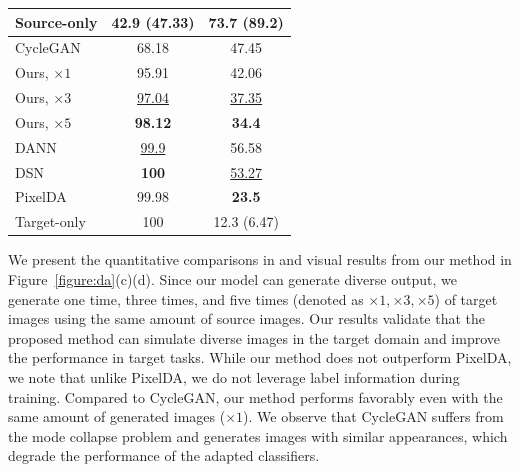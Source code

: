 \documentclass[runningheads]{llncs}
\begin{document}
\begin{table}[t]
{\begin{tabular}{l cc}
        Source-only & 42.9 (47.33) & 73.7 (89.2) \\
        \midrule
        CycleGAN~\cite{zhu2017cyclegan} & 68.18 & 47.45 \\
        Ours, $\times 1$ & 95.91 & 42.06\\
        Ours, $\times 3$ & \underline{97.04} & \underline{37.35}\\
        Ours, $\times 5$ & \textbf{98.12} & \textbf{34.4}\\
        \midrule
        DANN~\cite{ganin2016domain} & \underline{99.9} & 56.58 \\
        DSN~\cite{bousmalis2016domain} & \textbf{100} & \underline{53.27} \\
        PixelDA~\cite{bousmalis2017unsupervisedda} & 99.98 &\textbf{23.5} \\ 
        \midrule
        Target-only & 100 &12.3 (6.47) \\
        \bottomrule
	\end{tabular}}
    \vspace{-4mm}
\end{table}


We present the quantitative comparisons in  and visual results from our method in Figure~\ref{figure:da}(c)(d).
%
Since our model can generate diverse output, we generate one time, three times, and five times (denoted as $\times 1, \times3, \times 5$) of target images using the same amount of source images.
%
Our results validate that the proposed method can simulate diverse images in the target domain and improve the performance in target tasks.
%
While our method does not outperform PixelDA, we note that unlike PixelDA, we do not leverage label information during training.
%
Compared to CycleGAN, our method performs favorably even with the same amount of generated images (\ie $\times 1$).
%
We observe that CycleGAN suffers from the mode collapse problem and generates images with similar appearances, which degrade the performance of the adapted classifiers.
\end{document}
